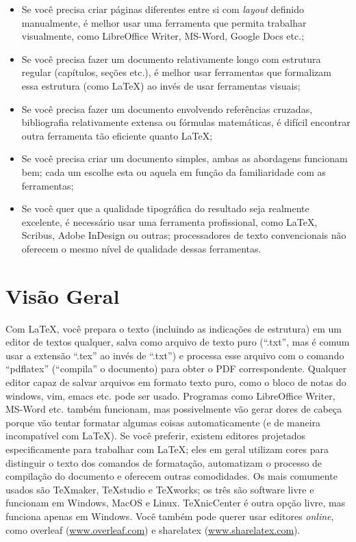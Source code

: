 \begin{itemize}
\item Se você precisa criar páginas diferentes entre si com \emph{layout}
definido manualmente, é melhor usar uma ferramenta que permita trabalhar
visualmente, como LibreOffice Writer, MS-Word, Google Docs etc.;

\item Se você precisa fazer um documento relativamente longo com estrutura
regular (capítulos, seções etc.), é melhor usar ferramentas que formalizam
essa estrutura (como \LaTeX{}) ao invés de usar ferramentas visuais;

\item Se você precisa fazer um documento envolvendo referências cruzadas,
bibliografia relativamente extensa ou fórmulas matemáticas, é difícil
encontrar outra ferramenta tão eficiente quanto \LaTeX{};

\item Se você precisa criar um documento simples, ambas as abordagens
funcionam bem; cada um escolhe esta ou aquela em função da familiaridade
com as ferramentas;

\item Se você quer que a qualidade tipográfica do resultado seja realmente
excelente, é necessário usar uma ferramenta profissional, como \LaTeX{},
Scribus, Adobe InDesign ou outras; processadores de texto convencionais não
oferecem o mesmo nível de qualidade dessas ferramentas.
\end{itemize}

\section{Visão Geral}

Com \LaTeX{}, você prepara o texto (incluindo as indicações de estrutura) em
um editor de textos qualquer, salva como arquivo de texto puro (``.txt'',
mas é comum usar a extensão ``.tex'' ao invés de ``.txt'') e processa esse
arquivo com o comando ``pdflatex'' (``compila'' o documento) para obter o
PDF correspondente. Qualquer editor capaz de salvar arquivos em formato
texto puro, como o bloco de notas do windows, vim, emacs etc. pode ser usado.
Programas como LibreOffice Writer, MS-Word etc. também funcionam, mas
possivelmente vão gerar dores de cabeça porque vão tentar formatar algumas
coisas automaticamente (e de maneira incompatível com \LaTeX{}). Se você
preferir, existem editores projetados especificamente para trabalhar com
\LaTeX{}; eles em geral utilizam cores para distinguir o texto dos comandos
de formatação, automatizam o processo de compilação do documento e oferecem
outras comodidades. Os mais comumente usados são TeXmaker, TeXstudio e
TeXworks; os três são software livre e funcionam em Windows, MacOS e Linux.
TeXnicCenter é outra opção livre, mas funciona apenas em Windows. Você também
pode querer usar editores \emph{online}, como overleaf (\url{www.overleaf.com})
e sharelatex (\url{www.sharelatex.com}).


